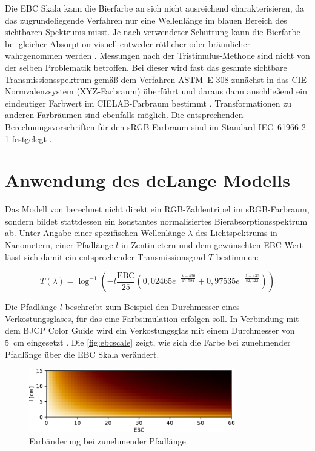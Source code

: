 \documentclass[10pt,a4paper,DIV=12,parskip=half]{scrarticle}
\begin{document}
Die EBC Skala kann die Bierfarbe an sich nicht ausreichend charakterisieren, da das zugrundeliegende Verfahren nur eine Wellenlänge im blauen Bereich des sichtbaren Spektrums misst. Je nach verwendeter Schüttung kann die Bierfarbe bei gleicher Absorption visuell entweder rötlicher oder bräunlicher wahrgenommen werden \parencite{Tucker2017}. Messungen nach der Tristimulus-Methode sind nicht von der selben Problematik betroffen. Bei dieser wird fast das gesamte sichtbare Transmissionsspektrum gemäß dem Verfahren ASTM~E-308 zunächst in das CIE-Normvalenzsystem (XYZ-Farbraum) überführt und daraus dann anschließend ein eindeutiger Farbwert im CIELAB-Farbraum bestimmt \parencites{deLange2016}{ASBC2011}. Transformationen zu anderen Farbräumen sind ebenfalls möglich. Die entsprechenden Berechnungsvorschriften für den sRGB-Farbraum sind im Standard IEC~61966-2-1 festgelegt \parencite{W3C2015}.

\section*{Anwendung des deLange Modells}

Das Modell von \cite{deLange2016} berechnet nicht direkt ein RGB-Zahlentripel im sRGB-Farbraum, sondern bildet stattdessen ein konstantes normalisiertes Bierabsorptionsspektrum ab. Unter Angabe einer spezifischen Wellenlänge $\lambda$ des Lichtspektrums in Nanometern, einer Pfadlänge $l$ in Zentimetern und dem gewünschten EBC Wert lässt sich damit ein entsprechender Transmissionsgrad $T$ bestimmen:

\begin{equation*}
T(\lambda)=\log^{-1}\left(-l \frac{\text{EBC}}{25} \left(0,02465e^{-\frac{\lambda-430}{17,591}}+0,97535e^{-\frac{\lambda-430}{82,122}}\right)\right)
\end{equation*}

Die Pfadlänge $l$ beschreibt zum Beispiel den Durchmesser eines Verkostungsglases, für das eine Farbsimulation erfolgen soll. In Verbindung mit dem BJCP Color Guide wird ein Verkostungsglas mit einem Durchmesser von 5~cm eingesetzt \parencite{BJCP}. Die \autoref{fig:ebcscale} zeigt, wie sich die Farbe bei zunehmender Pfadlänge über die EBC Skala verändert.

\begin{figure}[H]
	\centering
	\includegraphics[width=9cm]{ebc_scale.pdf}
	\caption{Farbänderung bei zunehmender Pfadlänge}
	\label{fig:ebcscale}
\end{figure}
\end{document}
